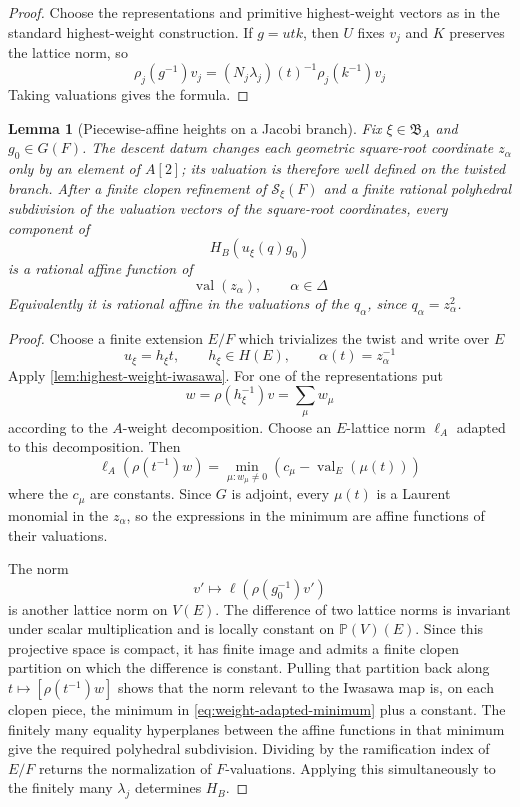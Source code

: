 \documentclass[11pt]{amsart}
\newtheorem{lemma}[lemma]{Lemma}
\theoremstyle{definition}
\theoremstyle{remark}
\newcommand{\cS}{\mathcal S}
\newcommand{\val}{\operatorname{val}}
\begin{document}
\begin{proof}
Choose the representations and primitive highest-weight vectors as in the
standard highest-weight construction.  If $g=utk$, then $U$ fixes $v_j$ and
$K$ preserves the lattice norm, so
\[
 \rho_j(g^{-1})v_j
 =(N_j\lambda_j)(t)^{-1}\rho_j(k^{-1})v_j
\]
Taking valuations gives the formula.
\end{proof}

\begin{lemma}[Piecewise-affine heights on a Jacobi branch]
\label{lem:piecewise-iwasawa}
Fix $\xi\in\mathfrak B_A$ and $g_0\in G(F)$.  The descent datum changes each
geometric square-root coordinate $z_\alpha$ only by an element of $A[2]$;
its valuation is therefore well defined on the twisted branch.  After a
finite clopen refinement of $\cS_\xi(F)$ and a finite rational polyhedral
subdivision of the valuation vectors of the square-root coordinates, every component of
\[
 H_B(u_\xi(q)g_0)
\]
is a rational affine function of
\[
 \val(z_\alpha),\qquad \alpha\in\Delta
\]
Equivalently it is rational affine in the valuations of the $q_\alpha$, since
$q_\alpha=z_\alpha^2$.
\end{lemma}

\begin{proof}
Choose a finite extension $E/F$ which trivializes the twist and write over
$E$
\[
 u_\xi=h_\xi t,
 \qquad h_\xi\in H(E),
 \qquad \alpha(t)=z_\alpha^{-1}
\]
Apply \cref{lem:highest-weight-iwasawa}.  For one of the representations put
\[
 w=\rho(h_\xi^{-1})v
   =\sum_\mu w_\mu
\]
according to the $A$-weight decomposition.  Choose an $E$-lattice norm
$\ell_A$ adapted to this decomposition.  Then
\begin{equation}\label{eq:weight-adapted-minimum}
 \ell_A(\rho(t^{-1})w)
 =\min_{\mu:w_\mu\ne0}
   \left(c_\mu-\val_E(\mu(t))\right)
\end{equation}
where the $c_\mu$ are constants.  Since $G$ is adjoint, every $\mu(t)$ is a
Laurent monomial in the $z_\alpha$, so the expressions in the minimum are
affine functions of their valuations.

The norm
\[
 v'\longmapsto
 \ell(\rho(g_0^{-1})v')
\]
is another lattice norm on $V(E)$.  The difference of two lattice norms is
invariant under scalar multiplication and is locally constant on
$\mathbb P(V)(E)$.  Since this projective space is compact, it has finite
image and admits a finite clopen partition on which the difference is
constant.  Pulling that partition back along
$t\mapsto[\rho(t^{-1})w]$ shows that the norm relevant to the Iwasawa map is,
on each clopen piece, the minimum in \eqref{eq:weight-adapted-minimum} plus a
constant.  The finitely many equality hyperplanes between the affine
functions in that minimum give the required polyhedral subdivision.  Dividing
by the ramification index of $E/F$ returns the normalization of $F$-valuations.
Applying this simultaneously to the finitely many $\lambda_j$ determines
$H_B$.
\end{proof}
\end{document}
